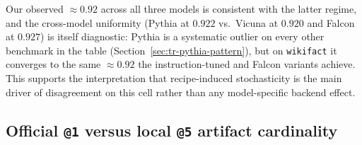 \documentclass[11pt]{article}
\begin{document}
Our observed $\approx 0.92$ across all three models is consistent
  with the latter regime, and the cross-model uniformity
  (Pythia at $0.922$ vs.\ Vicuna at $0.920$ and Falcon at $0.927$)
  is itself diagnostic: Pythia is a systematic outlier on every other
  benchmark in the table (Section~\ref{sec:tr-pythia-pattern}), but
  on \texttt{wikifact} it converges to the same $\approx 0.92$ the
  instruction-tuned and Falcon variants achieve.
This supports the interpretation that recipe-induced stochasticity
  is the main driver of disagreement on this cell rather than any
  model-specific backend effect.

\subsection{\texorpdfstring{Official \texttt{@1} versus local \texttt{@5} artifact cardinality}{Official @1 versus local @5 artifact cardinality}}
\label{sec:tr-case-c-cardinality}
\end{document}
